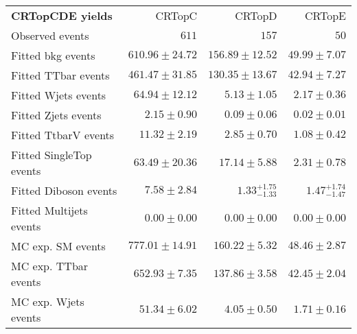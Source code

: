 

\begin{table}
\begin{center}
\setlength{\tabcolsep}{0.0pc}
{\small
\begin{tabular*}{\textwidth}{@{\extracolsep{\fill}}lrrr}
\noalign{\smallskip}\hline\noalign{\smallskip}
{\bf CRTopCDE yields}           & CRTopC            & CRTopD            & CRTopE              \\[-0.05cm]
\noalign{\smallskip}\hline\noalign{\smallskip}
Observed events          & $611$              & $157$              & $50$                    \\
\noalign{\smallskip}\hline\noalign{\smallskip}
Fitted bkg events         & $610.96 \pm 24.72$          & $156.89 \pm 12.52$          & $49.99 \pm 7.07$              \\
\noalign{\smallskip}\hline\noalign{\smallskip}
        Fitted TTbar events         & $461.47 \pm 31.85$          & $130.35 \pm 13.67$          & $42.94 \pm 7.27$              \\
        Fitted Wjets events         & $64.94 \pm 12.12$          & $5.13 \pm 1.05$          & $2.17 \pm 0.36$              \\
        Fitted Zjets events         & $2.15 \pm 0.90$          & $0.09 \pm 0.06$          & $0.02 \pm 0.01$              \\
        Fitted TtbarV events         & $11.32 \pm 2.19$          & $2.85 \pm 0.70$          & $1.08 \pm 0.42$              \\
        Fitted SingleTop events         & $63.49 \pm 20.36$          & $17.14 \pm 5.88$          & $2.31 \pm 0.78$              \\
        Fitted Diboson events         & $7.58 \pm 2.84$          & $1.33_{-1.33}^{+1.75}$          & $1.47_{-1.47}^{+1.74}$              \\
        Fitted Multijets events         & $0.00 \pm 0.00$          & $0.00 \pm 0.00$          & $0.00 \pm 0.00$              \\
 \noalign{\smallskip}\hline\noalign{\smallskip}
MC exp. SM events              & $777.01 \pm 14.91$          & $160.22 \pm 5.32$          & $48.46 \pm 2.87$              \\
\noalign{\smallskip}\hline\noalign{\smallskip}
        MC exp. TTbar events         & $652.93 \pm 7.35$          & $137.86 \pm 3.58$          & $42.45 \pm 2.04$              \\
        MC exp. Wjets events         & $51.34 \pm 6.02$          & $4.05 \pm 0.50$          & $1.71 \pm 0.16$              \\

\end{tabular*}}
\end{center}
\end{table}
